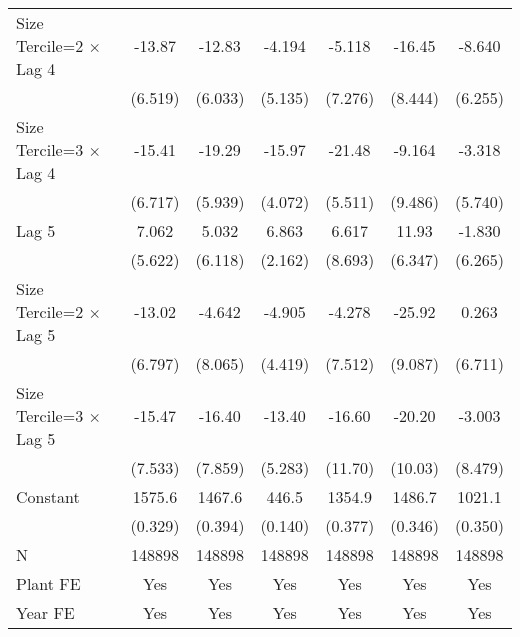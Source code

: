 \begin{table}[htbp]
\begin{tabular}{l*{6}{c}}
\addlinespace
Size Tercile=2 $\times$ Lag 4&   -13.87\sym{*}  &   -12.83\sym{*}  &   -4.194         &   -5.118         &   -16.45         &   -8.640         \\
                &  (6.519)         &  (6.033)         &  (5.135)         &  (7.276)         &  (8.444)         &  (6.255)         \\
\addlinespace
Size Tercile=3 $\times$ Lag 4&   -15.41\sym{*}  &   -19.29\sym{**} &   -15.97\sym{***}&   -21.48\sym{***}&   -9.164         &   -3.318         \\
                &  (6.717)         &  (5.939)         &  (4.072)         &  (5.511)         &  (9.486)         &  (5.740)         \\
\addlinespace
Lag 5           &    7.062         &    5.032         &    6.863\sym{**} &    6.617         &    11.93         &   -1.830         \\
                &  (5.622)         &  (6.118)         &  (2.162)         &  (8.693)         &  (6.347)         &  (6.265)         \\
\addlinespace
Size Tercile=2 $\times$ Lag 5&   -13.02         &   -4.642         &   -4.905         &   -4.278         &   -25.92\sym{**} &    0.263         \\
                &  (6.797)         &  (8.065)         &  (4.419)         &  (7.512)         &  (9.087)         &  (6.711)         \\
\addlinespace
Size Tercile=3 $\times$ Lag 5&   -15.47\sym{*}  &   -16.40\sym{*}  &   -13.40\sym{*}  &   -16.60         &   -20.20\sym{*}  &   -3.003         \\
                &  (7.533)         &  (7.859)         &  (5.283)         &  (11.70)         &  (10.03)         &  (8.479)         \\
\addlinespace
Constant        &   1575.6\sym{***}&   1467.6\sym{***}&    446.5\sym{***}&   1354.9\sym{***}&   1486.7\sym{***}&   1021.1\sym{***}\\
                &  (0.329)         &  (0.394)         &  (0.140)         &  (0.377)         &  (0.346)         &  (0.350)         \\
\midrule
N               &   148898         &   148898         &   148898         &   148898         &   148898         &   148898         \\
Plant FE        &      Yes         &      Yes         &      Yes         &      Yes         &      Yes         &      Yes         \\
Year FE         &      Yes         &      Yes         &      Yes         &      Yes         &      Yes         &      Yes         \\

\end{tabular}
\end{table}

